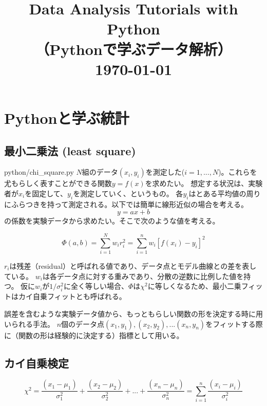 \documentclass[oneside, uplatex]{jsbook}
\title
{
  \vspace{-2cm}
  \vspace{3cm}
  {\huge {\bf Data Analysis Tutorials with Python} }\\
  \vspace{3mm}
  {\bf （Pythonで学ぶデータ解析）} \\
  \vspace{3mm}
  \today\\
  \vspace{6cm}
}
\date{}
\begin{document}
\maketitle
\tableofcontents








\chapter{Pythonと学ぶ統計}
\section{最小二乗法 (least square)}
python/chi\_square.py
$N$組のデータ$(x_i,y_i)$を測定した($i=1,...,N$)。これらを尤もらしく表すことができる関数$y=f(x)$を求めたい。
想定する状況は、実験者が$x_i$を固定して、$y_i$を測定していく、というもの。
各$y_i$はとある平均値の周りにふらつきを持って測定される。以下では簡単に線形近似の場合を考える。
\begin{equation}
  y = ax + b
\end{equation}
の係数を実験データから求めたい。そこで次のような値を考える。

\begin{equation}
  \Phi(a,b) = \sum_{i=1}^{N} w_i r_i^{2} = \sum_{i=1}^{n} w_i[f(x_i)-y_i]^2
\end{equation}

$r_i$は残差（residual）と呼ばれる値であり、データ点とモデル曲線との差を表している。
$w_i$は各データ点に対する重みであり、分散の逆数に比例した値を持つ。
仮に$w_i$が$1/\sigma_i^2$に全く等しい場合、$\Phi$は$\chi^2$に等しくなるため、最小二乗フィットはカイ自乗フィットとも呼ばれる。


誤差を含むような実験データ値から、もっともらしい関数の形を決定する時に用いられる手法。
$n$個のデータ点$(x_1,y_1), (x_2,y_2), ... (x_n, y_n)$をフィットする際に（関数の形は経験的に決定する）指標として用いる。

\section{カイ自乗検定}

\begin{equation}
  \chi^2 = \frac{(x_1-\mu_1)}{\sigma_1^2} + \frac{(x_2-\mu_2)}{\sigma_2^2} + ... + \frac{(x_n-\mu_n)}{\sigma_n^2} = \sum_{i=1}^{n} \frac{(x_i-\mu_i)}{\sigma_i^2}
\end{equation}
\end{document}
